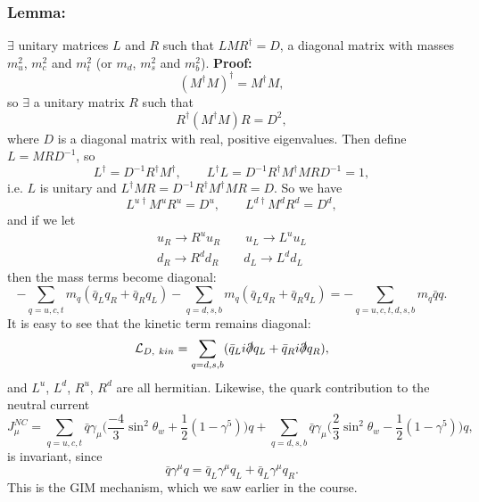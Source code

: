 \subsubsection{Lemma:}
 $\exists$ unitary matrices $L$ and $R$ such that $LMR^\dagger=D$, a diagonal matrix with masses $m_u^2$, $m_c^2$ and $m_t^2$ (or $m_d$, $m_s^2$ and $m_b^2$). \newline
\textbf{Proof: }
\begin{equation}
(M^\dagger M)^\dagger = M^\dagger M, 
\end{equation}
so $\exists$ a unitary matrix $R$ such that
\begin{equation}
R^\dagger(M^\dagger M)R = D^2,
\end{equation}
where $D$ is a diagonal matrix with real, positive eigenvalues. Then define $L = MRD^{-1}$, so
\begin{equation}
L^\dagger = D^{-1}R^\dagger M^\dagger, \qquad L^\dagger L = D^{-1}R^\dagger M^\dagger MR D^{-1} = 1,
\end{equation}
i.e. $L$ is unitary and $L^\dagger MR = D^{-1}R^\dagger M^\dagger MR = D$.
\newline
\newline
\newline
So we have
\begin{equation}
L^{u \dagger}M^u R^u = D^u, \qquad L^{d \dagger}M^d R^d = D^d,
\end{equation}
and if we let
\begin{equation}
\begin{split}
u_R \to R^u u_R \qquad u_L \to L^u u_L \\
d_R \to R^d d_R \qquad d_L \to L^d d_L
\end{split}
\end{equation}
then the mass terms become diagonal:
\begin{equation}
- \sum_{q = u,c,t} m_q(\bar{q}_L q_R + \bar{q}_R q_L) - \sum_{q = d,s,b} m_q(\bar{q}_L q_R + \bar{q}_R q_L) = - \sum_{q=u,c,t,d,s,b} m_q \bar{q}{q}.
\end{equation}
It is easy to see that the kinetic term remains diagonal:
\begin{equation}
\mathcal{L}_{D,\ kin} = \sum_{q = d,s,b}(\bar{q}_L i \slashed{\partial} q_L + \bar{q}_R i \slashed{\partial} q_R),
\end{equation}
and $L^u$, $L^d$, $R^u$, $R^d$ are all hermitian. Likewise, the quark contribution to the neutral current
\begin{equation}
J_\mu^{NC} = \sum_{q=u,c,t}\bar{q}\gamma_\mu\bigg(\frac{-4}{3}\sin^2\theta_w +\frac{1}{2}(1-\gamma^5)\bigg)q + \sum_{q=d,s,b}\bar{q}\gamma_\mu\bigg(\frac{2}{3}\sin^2\theta_w -\frac{1}{2}(1-\gamma^5)\bigg)q,
\end{equation}
is invariant, since 
\begin{equation}
\bar{q}\gamma^\mu q = \bar{q}_L\gamma^\mu q_L + \bar{q}_L\gamma^\mu q_R.
\end{equation}
This is the GIM mechanism, which we saw earlier in the course.
%
